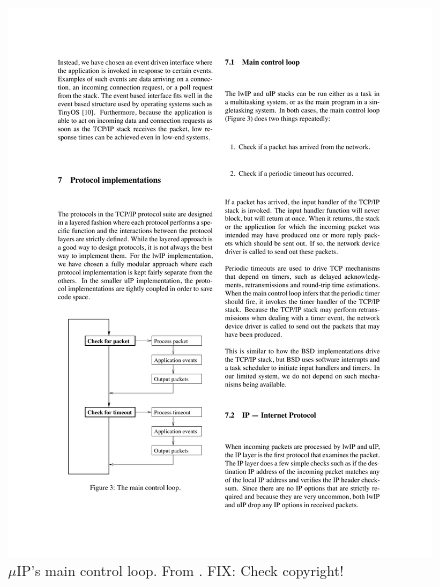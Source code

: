 \documentclass[final,a4paper,twoside,11pt,onecolumn]{report}
\begin{document}
\begin{figure}
   \centering
   \begin{minipage}{.5\textwidth}
      \centering
      \includegraphics[width=.9\linewidth]{dunkels-uip-main_loop}
      \caption{$\mu$IP's main control loop. From \citep[p.6]{dunkels2003full}. FIX: Check copyright!}
      \label{fig:uip-ml}
   \end{minipage}%
   \begin{minipage}{.5\textwidth}
      \centering

\end{minipage}
\end{figure}
\end{document}
